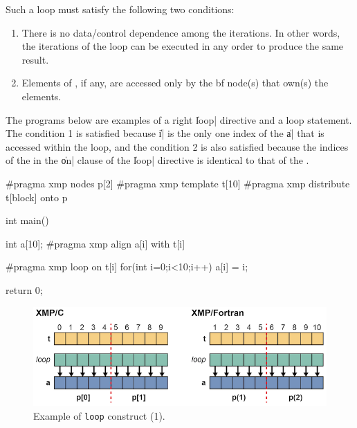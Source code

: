 Such a loop must satisfy the following two conditions:

\begin{enumerate}
  \item There is no data/control dependence among the iterations. In other
		words, the iterations of the loop can be executed in any order to
		produce the same result.
  \item Elements of {\darrays}, if any, are accessed only by the
		{bf node(s)} that own(s) the elements.
\end{enumerate}


The programs below are examples of a right \|loop| directive and a loop
statement.
%
The condition 1 is satisfied because \|i| is the only one index
of the {\darray} \|a| that is accessed within the loop,
%
and the condition 2 is also satisfied because the indices of the
{\template} in the \|on| clause of the \|loop| directive is identical to that
of the {\darray}.

\begin{XCexample}
#pragma xmp nodes p[2]
#pragma xmp template t[10]
#pragma xmp distribute t[block] onto p

int main(){
  int a[10];
#pragma xmp align a[i] with t[i]

#pragma xmp loop on t[i]
  for(int i=0;i<10;i++)
    a[i] = i;

  return 0;
}
\end{XCexample}


\begin{figure}
  \centering
  \includegraphics[width=\textwidth]{figs/loop1.png}
  \caption{Example of {\tt loop} construct (1).}
\end{figure}

